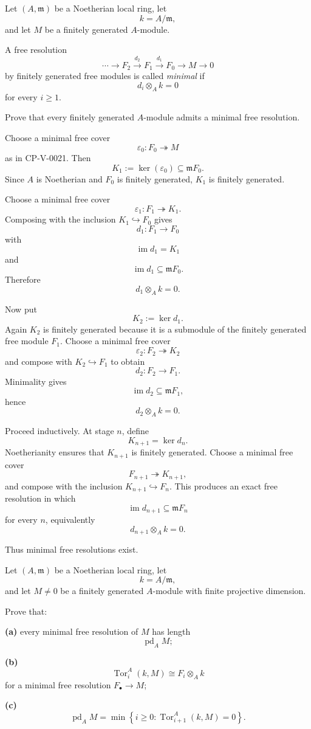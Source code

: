 \begin{problem}[CP-V-0042]
\label{prob:cp-v-0042}
Let \((A,\mathfrak m)\) be a Noetherian local ring, let
\[
k=A/\mathfrak m,
\]
and let \(M\) be a finitely generated \(A\)-module.

A free resolution
\[
\cdots\longrightarrow F_2\xrightarrow{d_2}F_1\xrightarrow{d_1}F_0
\longrightarrow M\longrightarrow0
\]
by finitely generated free modules is called \emph{minimal} if
\[
d_i\otimes_A k=0
\]
for every \(i\ge1\).

Prove that every finitely generated \(A\)-module admits a minimal free
resolution.
\end{problem}

\begin{solution}
Choose a minimal free cover
\[
\varepsilon_0:F_0\twoheadrightarrow M
\]
as in CP-V-0021. Then
\[
K_1:=\ker(\varepsilon_0)
\subseteq
\mathfrak mF_0.
\]
Since \(A\) is Noetherian and \(F_0\) is finitely generated, \(K_1\) is
finitely generated.

Choose a minimal free cover
\[
\varepsilon_1:F_1\twoheadrightarrow K_1.
\]
Composing with the inclusion \(K_1\hookrightarrow F_0\) gives
\[
d_1:F_1\to F_0
\]
with
\[
\operatorname{im}d_1=K_1
\]
and
\[
\operatorname{im}d_1\subseteq\mathfrak mF_0.
\]
Therefore
\[
d_1\otimes_Ak=0.
\]

Now put
\[
K_2:=\ker d_1.
\]
Again \(K_2\) is finitely generated because it is a submodule of the
finitely generated free module \(F_1\). Choose a minimal free cover
\[
\varepsilon_2:F_2\twoheadrightarrow K_2
\]
and compose with \(K_2\hookrightarrow F_1\) to obtain
\[
d_2:F_2\to F_1.
\]
Minimality gives
\[
\operatorname{im}d_2\subseteq\mathfrak mF_1,
\]
hence
\[
d_2\otimes_Ak=0.
\]

Proceed inductively. At stage \(n\), define
\[
K_{n+1}=\ker d_n.
\]
Noetherianity ensures that \(K_{n+1}\) is finitely generated. Choose a
minimal free cover
\[
F_{n+1}\twoheadrightarrow K_{n+1},
\]
and compose with the inclusion \(K_{n+1}\hookrightarrow F_n\). This produces
an exact free resolution in which
\[
\operatorname{im}d_{n+1}\subseteq\mathfrak mF_n
\]
for every \(n\), equivalently
\[
d_{n+1}\otimes_Ak=0.
\]

Thus minimal free resolutions exist.
\end{solution}


\begin{problem}[CP-V-0043]
\label{prob:cp-v-0043}
Let \((A,\mathfrak m)\) be a Noetherian local ring, let
\[
k=A/\mathfrak m,
\]
and let \(M\ne0\) be a finitely generated \(A\)-module with finite projective
dimension.

Prove that:

\textbf{(a)} every minimal free resolution of \(M\) has length
\[
\operatorname{pd}_A M;
\]

\textbf{(b)}
\[
\operatorname{Tor}_i^A(k,M)\cong F_i\otimes_Ak
\]
for a minimal free resolution \(F_\bullet\to M\);

\textbf{(c)}
\[
\operatorname{pd}_A M
=
\min\left\{
i\ge0:
\operatorname{Tor}_{i+1}^A(k,M)=0
\right\}.
\]
\end{problem}

